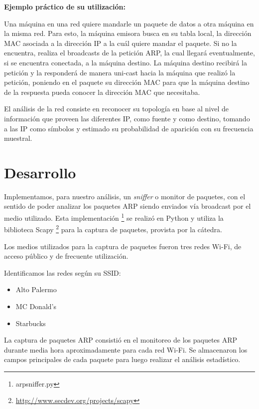 \documentclass[a4paper, 10pt, twoside]{article}
\begin{document}
\textbf{Ejemplo práctico de su utilización:}

Una máquina en una red quiere mandarle un paquete de datos a otra máquina en la misma red. Para esto, la máquina emisora busca en su tabla local, la dirección MAC asociada a la dirección IP a la cuál quiere mandar el paquete. Si no la encuentra, realiza el broadcasts de la petición ARP, la cual llegará eventualmente, si se encuentra conectada, a la máquina destino. La máquina destino recibirá la petición y la responderá de manera uni-cast hacia la máquina que realizó la petición, poniendo en el paquete su dirección MAC para que la máquina destino de la respuesta pueda conocer la dirección MAC que necesitaba.

El análisis de la red consiste en reconocer su topología en base al nivel de información que proveen las diferentes IP, como fuente y como destino, tomando a las IP como símbolos y estimado su probabilidad de aparición con su frecuencia muestral.




\section{Desarrollo}

Implementamos, para nuestro análisis, un \textit{sniffer} o monitor de paquetes, con el sentido de poder analizar los paquetes ARP siendo enviados vía broadcast por el medio utilizado. Esta implementación \footnote{arpsniffer.py} se realizó en Python y utiliza la biblioteca Scapy \footnote{\url{http://www.secdev.org/projects/scapy}} para la captura de paquetes, provista por la cátedra.

Los medios utilizados para la captura de paquetes fueron tres redes Wi-Fi, de acceso público y de frecuente utilización.

Identificamos las redes según su SSID:
\begin{itemize}
	\item Alto Palermo
	\item MC Donald's
	\item Starbucks
\end{itemize}

La captura de paquetes ARP consistió en el monitoreo de los paquetes ARP durante media hora aproximadamente para cada red Wi-Fi. Se almacenaron los campos principales de cada paquete para luego realizar el análisis estadístico.
\end{document}
